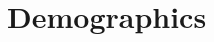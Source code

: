 \section*{Demographics}\label{demographics}


\newpage

\newpage

\newpage

\newpage

\newpage

\newpage


